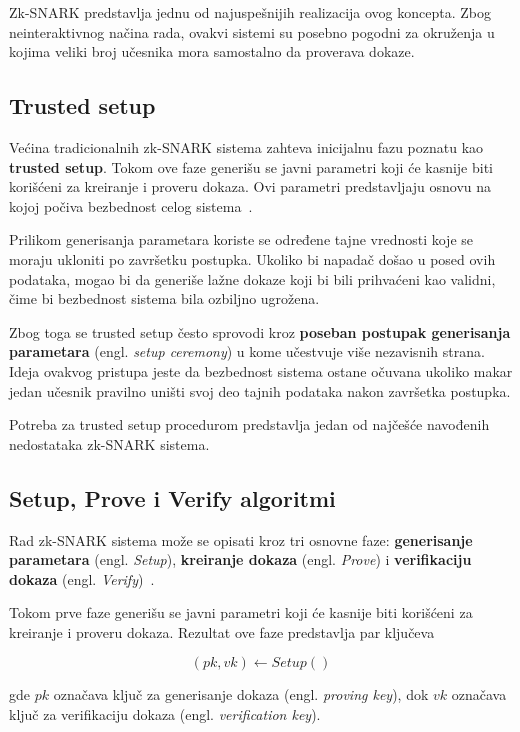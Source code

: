 Zk-SNARK predstavlja jednu od najuspešnijih realizacija ovog koncepta. Zbog neinteraktivnog načina rada, ovakvi sistemi su posebno pogodni za okruženja u kojima veliki broj učesnika mora samostalno da proverava dokaze.

\subsection{Trusted setup}

Većina tradicionalnih zk-SNARK sistema zahteva inicijalnu fazu poznatu kao \textbf{trusted setup}. Tokom ove faze generišu se javni parametri koji će kasnije biti korišćeni za kreiranje i proveru dokaza. Ovi parametri predstavljaju osnovu na kojoj počiva bezbednost celog sistema~\cite{nitulescu2023snarks}.

Prilikom generisanja parametara koriste se određene tajne vrednosti koje se moraju ukloniti po završetku postupka. Ukoliko bi napadač došao u posed ovih podataka, mogao bi da generiše lažne dokaze koji bi bili prihvaćeni kao validni, čime bi bezbednost sistema bila ozbiljno ugrožena.

Zbog toga se trusted setup često sprovodi kroz \textbf{poseban postupak generisanja parametara} (engl. \textit{setup ceremony}) u kome učestvuje više nezavisnih strana. Ideja ovakvog pristupa jeste da bezbednost sistema ostane očuvana ukoliko makar jedan učesnik pravilno uništi svoj deo tajnih podataka nakon završetka postupka.

Potreba za trusted setup procedurom predstavlja jedan od najčešće navođenih nedostataka zk-SNARK sistema. 

\subsection{Setup, Prove i Verify algoritmi}

Rad zk-SNARK sistema može se opisati kroz tri osnovne faze: \textbf{generisanje parametara} (engl. \textit{Setup}), \textbf{kreiranje dokaza} (engl. \textit{Prove}) i \textbf{verifikaciju dokaza} (engl. \textit{Verify})~\cite{nitulescu2023snarks}.

Tokom prve faze generišu se javni parametri koji će kasnije biti korišćeni za kreiranje i proveru dokaza. Rezultat ove faze predstavlja par ključeva

\[
(pk,vk) \leftarrow Setup()
\]

gde \(pk\) označava ključ za generisanje dokaza (engl. \textit{proving key}), dok \(vk\) označava ključ za verifikaciju dokaza (engl. \textit{verification key}).

